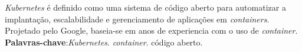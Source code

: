 
\begin{resumo}[RESUMO]
\begin{SingleSpacing}


\textit{Kubernetes} é definido como uma sistema de código aberto para automatizar a implantação, escalabilidade e gerenciamento de aplicações em \textit{containers}.
Projetado pelo Google, baseia-se em anos de experiencia com o uso de \textit{container}.\\

\textbf{Palavras-chave}:\textit{Kubernetes}. \textit{container}. código aberto.

\end{SingleSpacing}
\end{resumo}


